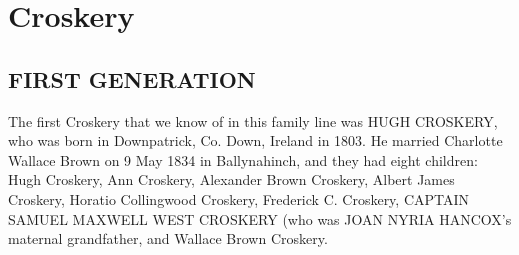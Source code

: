 \section{Croskery}

\subsection{FIRST GENERATION}

The first Croskery that we know of in this family line was \uppercase{Hugh Croskery}, who was born in Downpatrick, Co. Down, Ireland in 1803.  He married Charlotte Wallace Brown on 9 May 1834 in Ballynahinch,  and they had eight children: Hugh Croskery, Ann Croskery, Alexander Brown Croskery, Albert James Croskery, Horatio Collingwood Croskery, Frederick C. Croskery, \uppercase{Captain Samuel Maxwell West Croskery} (who was \uppercase{Joan Nyria Hancox}'s maternal grandfather, and Wallace Brown Croskery.

